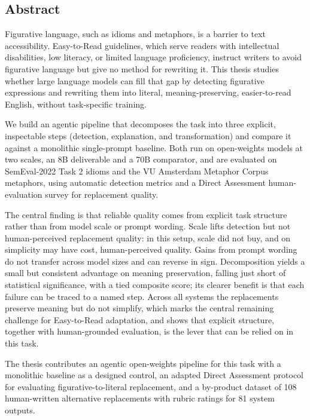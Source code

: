\vspace*{15em}

\begin{center}
    \section*{Abstract}

    Figurative language, such as idioms and metaphors, is a barrier to text accessibility. Easy-to-Read guidelines, which serve readers with intellectual disabilities, low literacy, or limited language proficiency, instruct writers to avoid figurative language but give no method for rewriting it. This thesis studies whether large language models can fill that gap by detecting figurative expressions and rewriting them into literal, meaning-preserving, easier-to-read English, without task-specific training.

    We build an agentic pipeline that decomposes the task into three explicit, inspectable steps (detection, explanation, and transformation) and compare it against a monolithic single-prompt baseline. Both run on open-weights models at two scales, an 8B deliverable and a 70B comparator, and are evaluated on SemEval-2022 Task 2 idioms and the VU Amsterdam Metaphor Corpus metaphors, using automatic detection metrics and a Direct Assessment human-evaluation survey for replacement quality.

    The central finding is that reliable quality comes from explicit task structure rather than from model scale or prompt wording. Scale lifts detection but not human-perceived replacement quality: in this setup, scale did not buy, and on simplicity may have cost, human-perceived quality. Gains from prompt wording do not transfer across model sizes and can reverse in sign. Decomposition yields a small but consistent advantage on meaning preservation, falling just short of statistical significance, with a tied composite score; its clearer benefit is that each failure can be traced to a named step. Across all systems the replacements preserve meaning but do not simplify, which marks the central remaining challenge for Easy-to-Read adaptation, and shows that explicit structure, together with human-grounded evaluation, is the lever that can be relied on in this task.

    The thesis contributes an agentic open-weights pipeline for this task with a monolithic baseline as a designed control, an adapted Direct Assessment protocol for evaluating figurative-to-literal replacement, and a by-product dataset of 108 human-written alternative replacements with rubric ratings for 81 system outputs.

\end{center}


{}

\newpage